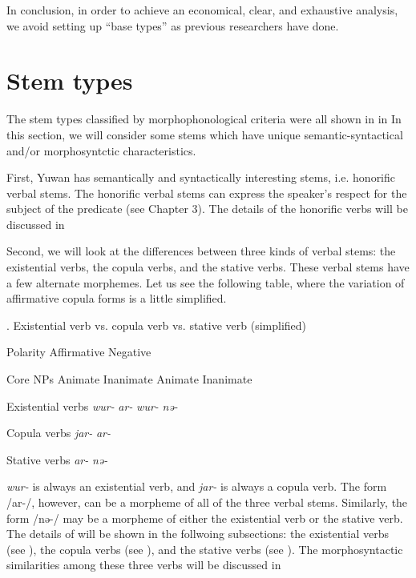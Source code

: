   In conclusion, in order to achieve an economical, clear, and exhaustive analysis, we avoid setting up “base types” as previous researchers have done.

\section{Stem types}

The stem types classified by morphophonological criteria were all shown in  in  In this section, we will consider some stems which have unique semantic-syntactical and/or morphosyntctic characteristics.

  First, Yuwan has semantically and syntactically interesting stems, i.e. honorific verbal stems. The honorific verbal stems can express the speaker’s respect for the subject of the predicate (see Chapter 3). The details of the honorific verbs will be discussed in 

  Second, we will look at the differences between three kinds of verbal stems: the existential verbs, the copula verbs, and the stative verbs. These verbal stems have a few alternate morphemes. Let us see the following table, where the variation of affirmative copula forms is a little simplified.

\begin{styleBeschriftung}
\textmd{}\textmd{. Existential verb vs. copula verb vs. stative verb (simplified)}
\end{styleBeschriftung}

Polarity  Affirmative  Negative

Core NPs  Animate  Inanimate  Animate  Inanimate

Existential verbs  \textit{wur-}  \textit{ar-}  \textit{wur-}  \textit{nə-}

Copula verbs  \textit{jar-}  \textit{ar-}

Stative verbs  \textit{ar-}  \textit{nə-}

\textit{wur-} is always an existential verb, and \textit{jar-} is always a copula verb. The form /ar-/, however, can be a morpheme of all of the three verbal stems. Similarly, the form /nə-/ may be a morpheme of either the existential verb or the stative verb. The details of  will be shown in the follwoing subsections: the existential verbs (see ), the copula verbs (see ), and the stative verbs (see ). The morphosyntactic similarities among these three verbs will be discussed in 

